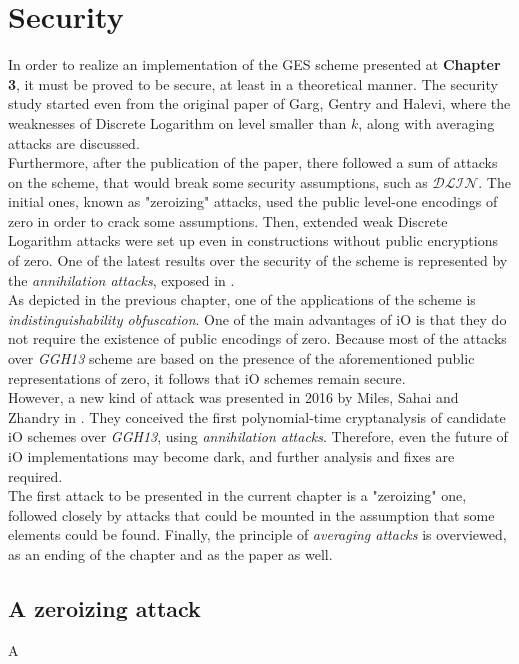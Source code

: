 \chapter {Security}

In order to realize an implementation of the GES scheme presented at \textbf{Chapter 3}, it must be proved to be secure, at least in a theoretical manner. The security study started even from the original paper of Garg, Gentry and Halevi, where the weaknesses of Discrete Logarithm on level smaller than $k$, along with averaging attacks are discussed.\\

Furthermore, after the publication of the paper, there followed a sum of attacks on the scheme, that would break some security assumptions, such as $\mathcal{DLIN}$. The initial ones, known as "zeroizing" attacks, used the public level-one encodings of zero in order to crack some assumptions. Then, extended weak Discrete Logarithm attacks were set up even in constructions without public encryptions of zero. One of the latest results over the security of the scheme is represented by the \textit{annihilation attacks}, exposed in \cite{MSZ16}.\\

As depicted in the previous chapter, one of the applications of the scheme is \textit{indistinguishability obfuscation}. One of the main advantages of iO is that they do not require the existence of public encodings of zero. Because most of the attacks over \textit{GGH13} scheme are based on the presence of the aforementioned public representations of zero, it follows that iO schemes remain secure.\\

However, a new kind of attack was presented in 2016 by Miles, Sahai and Zhandry in \cite{MSZ16}. They conceived the first polynomial-time cryptanalysis of candidate iO schemes over \textit{GGH13}, using \textit{annihilation attacks}. Therefore, even the future of iO implementations may become dark, and further analysis and fixes are required. \\

The first attack to be presented in the current chapter is a "zeroizing" one, followed closely by attacks that could be mounted in the assumption that some elements could be found. Finally, the principle of \textit{averaging attacks} is overviewed, as an ending of the chapter and as the paper as well.

\section{A zeroizing attack}

A
